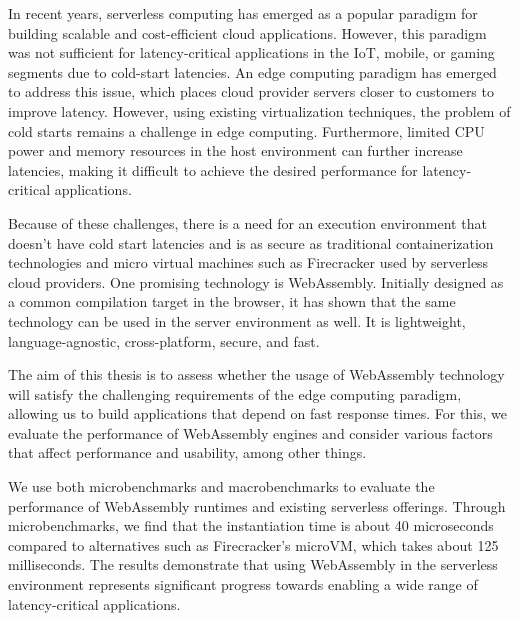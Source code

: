 In recent years, serverless computing has emerged as a popular paradigm for building scalable and cost-efficient cloud applications. However, this paradigm was not sufficient for latency-critical applications in the IoT, mobile, or gaming segments due to cold-start latencies. An edge computing paradigm has emerged to address this issue, which places cloud provider servers closer to customers to improve latency. However, using existing virtualization techniques, the problem of cold starts remains a challenge in edge computing. Furthermore, limited CPU power and memory resources in the host environment can further increase latencies, making it difficult to achieve the desired performance for latency-critical applications. 

Because of these challenges, there is a need for an execution environment that doesn't have cold start latencies and is as secure as traditional containerization technologies and micro virtual machines such as Firecracker used by serverless cloud providers. One promising technology is WebAssembly. Initially designed as a common compilation target in the browser, it has shown that the same technology can be used in the server environment as well. It is lightweight, language-agnostic, cross-platform, secure, and fast.

The aim of this thesis is to assess whether the usage of WebAssembly technology will satisfy the challenging requirements of the edge computing paradigm, allowing us to build applications that depend on fast response times. For this, we evaluate the performance of WebAssembly engines and consider various factors that affect performance and usability, among other things. 

We use both microbenchmarks and macrobenchmarks to evaluate the performance of \hbox{WebAssembly} runtimes and existing serverless offerings. Through microbenchmarks, we find that the instantiation time is about 40 microseconds compared to alternatives such as Firecracker's microVM, which takes about 125 milliseconds. The results demonstrate that using WebAssembly in the serverless environment represents significant progress towards enabling a wide range of latency-critical applications.
